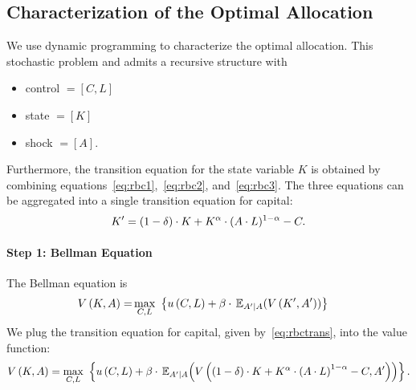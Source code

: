 \documentclass[letterpaper,12pt,leqno]{article}
\begin{document}
\subsection{Characterization of the Optimal Allocation}

We use dynamic programming to characterize the optimal allocation. This stochastic problem and admits a recursive structure with
\begin{itemize}
\item control $=[C,L]$
\item state $=[K]$
\item shock $=[A]$.
\end{itemize}
Furthermore, the transition equation for the state variable $K$ is obtained by combining equations~\eqref{eq:rbc1},~\eqref{eq:rbc2}, and~\eqref{eq:rbc3}. The three equations can be aggregated into a single transition equation for capital:
\begin{equation}
K'=(1-\delta) \cdot K+K^{\alpha} \cdot (A \cdot L)^{1-\alpha}-C\label{eq:rbctrans}.
\end{equation}

\paragraph{Step 1: Bellman Equation} The Bellman equation is
\begin{align*}
V\bp{K,A}=&\max_{C,L}\ \bc{u\bp{C,L}  +\b\cdot\E[A'|A]{ V\bp{K',A'}  }}
\end{align*}
We plug the transition equation for capital, given by~\eqref{eq:rbctrans}, into the value function:
\begin{align*}
V\bp{K,A}=\max_{C,L}\ \bc{u\bp{C,L}+\b  \cdot \E[A'|A]{V\bp{(1-\d)\cdot K+K^{\a} \cdot \bp{A \cdot L}^{1-\a}-C, A'}}}.
\end{align*}
\end{document}
